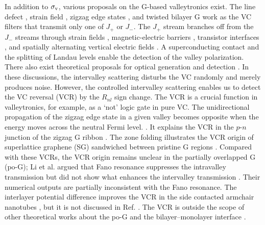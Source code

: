 \documentclass{jpsj3}
\begin{document}
In addition to $\sigma_{\rm v}$, various proposals on the G-based valleytronics exist.
The line defect \cite{disclination-pair,disclination-pair2,disclination-pair3,disclination-pair4}, 
strain field \cite{bubble,bubble2,bubble3,37.,38.}, 
zigzag edge states \cite{41.,a4-3.,a4.,a4-2.}, and twisted bilayer G \cite{20.} work as the VC filters that transmit only one of $J_+$ or  $J_-$.
The $J_+$ stream branches off from the $J_-$ streams through strain fields \cite{4,a7.}, magnetic-electric barriers \cite{36.}, transistor interfaces \cite{5}, 
and spatially alternating vertical electric fields 
\cite{top-back-gate}.
A superconducting contact \cite{25.,21.} and the splitting of Landau levels \cite{19.} enable  the detection of  the valley polarization.
There also exist theoretical proposals for optical generation 
\cite{a1.,a2.,L-1.,L-5.,L-6.,L-7.,Dixit-1,Dixit-2,L-3.,L-10.} and detection \cite{L-8.,L-9.}.
In these discussions, the intervalley scattering disturbs the VC randomly
and merely produces noise.
However, the controlled intervalley scattering 
enables us to detect 
the VC reversal (VCR) by the $R_{nl}$ sign change.
The VCR is a crucial function in valleytronics, for example, as a `not' logic gate
in pure VC. The unidirectional propagation of the zigzag edge state in a given valley becomes opposite when the energy moves across the neutral Fermi level. \cite{41.,a4.}.
It explains the VCR in the $p$-$n$ junction of the zigzag G ribbon \cite{40.}.
The zone folding illustrates the VCR 
origin of superlattice graphene (SG) sandwiched between pristine G regions 
\cite{graphene-precession,graphene-precession2,graphene-precession3}.
Compared with these VCRs, the VCR origin remains unclear in 
the partially overlapped G (po-G);
 Li et al. argued that Fano resonance suppresses the intravalley transmission
but did not show what enhances the intervalley transmission \cite{gra-gra-junction}.
Their numerical outputs are partially inconsistent with the Fano resonance.
The interlayer potential difference improves the VCR in the side contacted
armchair nanotubes \cite{tamura-2021}, but it is not discussed in Ref. \cite{gra-gra-junction} . 
The VCR is outside the scope of other theoretical works about the po-G
\cite{7.,9.,10.,12.,13.,14.,16.,17.,a3.,(4)} and the bilayer--monolayer interface \cite{15.,18.}.
\end{document}
